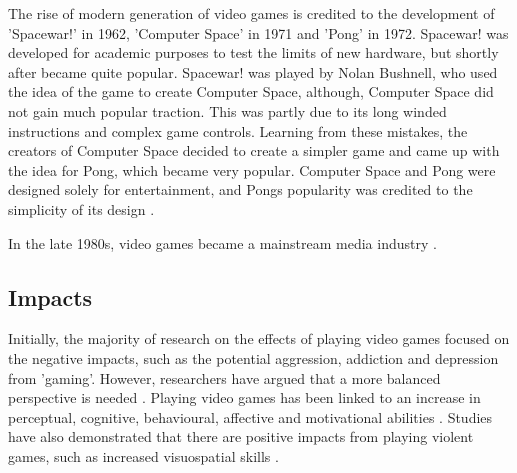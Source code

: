 \documentclass[a4paper,11.5pt]{report}
\numberwithin{figure}{section}
\numberwithin{table}{section}
\numberwithin{equation}{section}
\numberwithin{equation}{section}
\begin{document}

The rise of modern generation of video games is credited to the development of 'Spacewar!' in 1962, 'Computer Space' in 1971 and 'Pong' in 1972. Spacewar! was developed for academic purposes to test the limits of new hardware, but shortly after became quite popular. Spacewar! was played by Nolan Bushnell, who used the idea of the game to create Computer Space, although, Computer Space did not gain much popular traction. This was partly due to its long winded instructions and complex game controls. Learning from these mistakes, the creators of Computer Space decided to create a simpler game and came up with the idea for Pong, which became very popular. Computer Space and Pong were designed solely for entertainment, and Pongs popularity was credited to the simplicity of its design \citep{Lowood2009}.



In the late 1980s, video games became a mainstream media industry \citep{Dmitri2003}.

\subsection{Impacts}


Initially, the majority of research on the effects of playing video games focused on the negative impacts, such as the potential aggression, addiction and depression from 'gaming'. However, researchers have argued that a more balanced perspective is needed \citep{Granic2014}. Playing video games has been linked to an increase in perceptual, cognitive, behavioural, affective and motivational abilities \citep{Connolly2012}. Studies have also demonstrated that there are positive impacts from playing violent games, such as increased visuospatial skills \citep{Ferguson2007}. 
\end{document}
